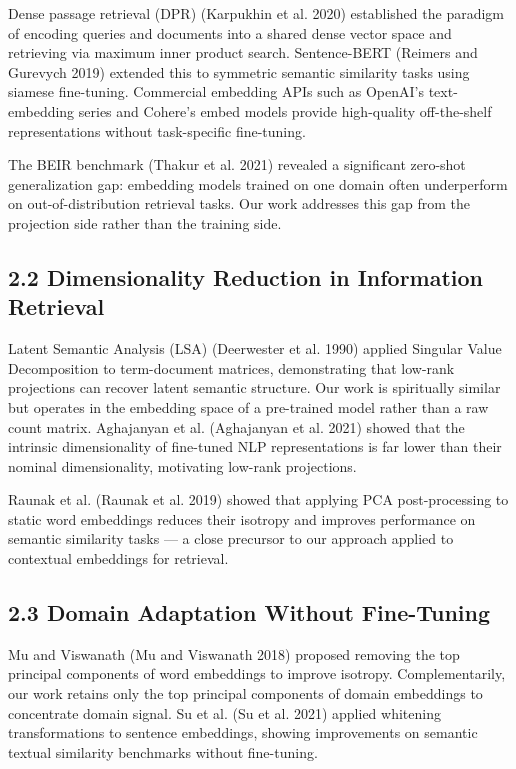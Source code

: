 \documentclass[
  11pt,
  letterpaper,
]{article}
\begin{document}
Dense passage retrieval (DPR) (Karpukhin et al. 2020) established the
paradigm of encoding queries and documents into a shared dense vector
space and retrieving via maximum inner product search. Sentence-BERT
(Reimers and Gurevych 2019) extended this to symmetric semantic
similarity tasks using siamese fine-tuning. Commercial embedding APIs
such as OpenAI's text-embedding series and Cohere's embed models provide
high-quality off-the-shelf representations without task-specific
fine-tuning.

The BEIR benchmark (Thakur et al. 2021) revealed a significant zero-shot
generalization gap: embedding models trained on one domain often
underperform on out-of-distribution retrieval tasks. Our work addresses
this gap from the projection side rather than the training side.

\subsection{2.2 Dimensionality Reduction in Information
Retrieval}\label{dimensionality-reduction-in-information-retrieval}

Latent Semantic Analysis (LSA) (Deerwester et al. 1990) applied Singular
Value Decomposition to term-document matrices, demonstrating that
low-rank projections can recover latent semantic structure. Our work is
spiritually similar but operates in the embedding space of a pre-trained
model rather than a raw count matrix. Aghajanyan et al. (Aghajanyan et
al. 2021) showed that the intrinsic dimensionality of fine-tuned NLP
representations is far lower than their nominal dimensionality,
motivating low-rank projections.

Raunak et al. (Raunak et al. 2019) showed that applying PCA
post-processing to static word embeddings reduces their isotropy and
improves performance on semantic similarity tasks --- a close precursor
to our approach applied to contextual embeddings for retrieval.

\subsection{2.3 Domain Adaptation Without
Fine-Tuning}\label{domain-adaptation-without-fine-tuning}

Mu and Viswanath (Mu and Viswanath 2018) proposed removing the top
principal components of word embeddings to improve isotropy.
Complementarily, our work retains only the top principal components of
domain embeddings to concentrate domain signal. Su et al. (Su et al.
2021) applied whitening transformations to sentence embeddings, showing
improvements on semantic textual similarity benchmarks without
fine-tuning.
\end{document}
